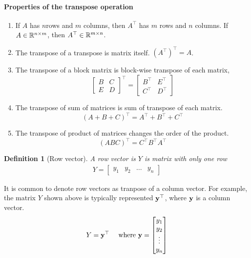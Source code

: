 \documentclass{article}
\newtheorem{defn}{Definition}
\begin{document}
\paragraph{Properties of the transpose operation}
\begin{enumerate}
\item  If $A$ has $n$rows and  $m$  columns, then  $A^\top$  has $m$ rows and
  $n$  columns. If  $A \in \mathbb{R}^{n \times  m}$, then  $A^\top \in \mathbb{R}^{m
    \times n}$.
  \item  The transpose  of  a transpose is matrix itself. $(A^\top)^\top = A$.
  \item  The transpose of a block matrix is  block-wise  transpose  of  each
    matrix,
    \[
    \begin{bmatrix}
      B  &   C \\
      E & D
    \end{bmatrix}^\top
    = 
    \begin{bmatrix}
      B^\top  & E^\top \\
      C^\top & D^\top
    \end{bmatrix}
    \]
  \item The transpose of sum of matrices is sum of transpose of each matrix.
    \[ (A+B+C)^\top = A^\top + B^\top + C^\top \]
  \item The transpose of product of matrices changes the order of the product. 
    \[ (ABC)^\top = C^\top B^\top A^\top \]
\end{enumerate}


\begin{defn}[Row vector]
  A row vector is $Y$ is matrix  with only one row
  \begin{align}
    Y  =  \begin{bmatrix}
      y_{1} &
      y_{2} &
      \dots  &
      y_{n}
    \end{bmatrix}
  \end{align}
\end{defn}
It is common  to denote row vectors as tranpose  of  a  column vector. For
example, the  matrix  $Y$ shown above is typically represented  $\mathbf{y}^\top$, where
$\mathbf{y}$  is a column vector.
%
  \begin{align}
    Y  &=  \mathbf{y}^\top & \text{ where } \mathbf{y} = \begin{bmatrix}
      y_{1} \\
      y_{2} \\
      \vdots  \\
      y_{n}
    \end{bmatrix}
  \end{align}
\end{document}
